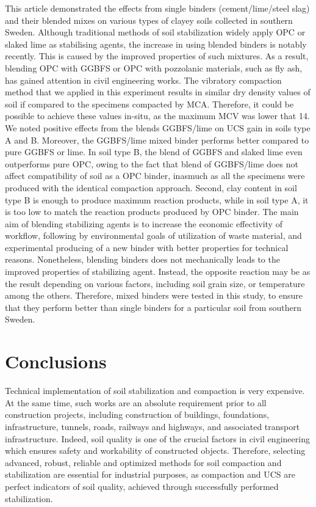 \documentclass[electronics,article,submit,pdftex,moreauthors]{Definitions/mdpi}
\begin{document}
	This article demonstrated the effects from single binders (cement/lime/steel slag) and their blended mixes on various types of clayey soils collected in southern Sweden. Although traditional methods of soil stabilization widely apply OPC or slaked lime as stabilising agents, the increase in using blended binders is notably recently. This is caused by the improved properties of such mixtures. As a result, blending OPC with GGBFS or OPC with pozzolanic materials, such as fly ash, has gained attention in civil engineering works. The vibratory compaction method that we applied in this experiment results in similar dry density values of soil if compared to the specimens compacted by MCA. Therefore, it could be possible to achieve these values in-situ, as the maximum MCV was lower that 14.
	We noted positive effects from the blends GGBFS/lime on UCS gain in soils type A and B. Moreover, the GGBFS/lime mixed binder performs better compared to pure GGBFS or lime. In soil type B, the blend of GGBFS and slaked lime even outperforms pure OPC, owing to the fact that blend of GGBFS/lime does not affect compatibility of soil as a OPC binder, inasmuch as all the specimens were produced with the identical compaction approach. Second, clay content in soil type B is enough to produce maximum reaction products, while in soil type A, it is too low to match the reaction products produced by OPC binder.
	The main aim of blending stabilizing agents is to increase the economic effectivity of workflow, following by environmental goals of utilization of waste material, and experimental producing of a new binder with better properties for technical reasons. Nonetheless, blending binders does not mechanically leads to the improved properties of stabilizing agent. Instead, the opposite reaction may be as the result depending on various factors, including soil grain size, or temperature among the others. Therefore, mixed binders were tested in this study, to ensure that they perform better than single binders for a particular soil from southern Sweden.

\section{Conclusions}

Technical implementation of soil stabilization and compaction is very expensive. At the same time, such works are an absolute requirement prior to all construction projects, including construction of buildings, foundations, infrastructure, tunnels, roads, railways and highways, and associated transport infrastructure. Indeed, soil quality is one of the crucial factors in civil engineering which ensures safety and workability of constructed objects. Therefore, selecting advanced, robust, reliable and optimized methods for soil compaction and stabilization are essential for industrial purposes, as compaction and UCS are perfect indicators of soil quality, achieved through successfully performed stabilization.
\end{document}
